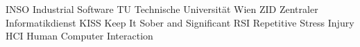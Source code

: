 	{INSO}	{Industrial Software}
	{TU}	{Technische Universit\"at Wien}
	{ZID}	{Zentraler Informatikdienst}
	{KISS}	{Keep It Sober and Significant}
	{RSI}	{Repetitive Stress Injury}
	{HCI}	{Human Computer Interaction}
